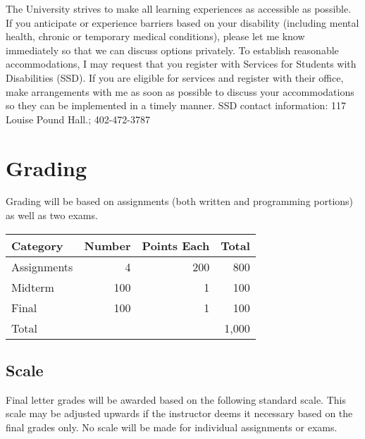 \documentclass[12pt]{scrartcl}
\begin{document}

The University strives to make all learning experiences as 
accessible as possible. If you anticipate or experience 
barriers based on your disability (including mental health, 
chronic or temporary medical conditions), please let me know 
immediately so that we can discuss options privately. To 
establish reasonable accommodations, I may request that you 
register with Services for Students with Disabilities (SSD). 
If you are eligible for services and register with their 
office, make arrangements with me as soon as possible to 
discuss your accommodations so they can be implemented in a 
timely manner. SSD contact information:  117 Louise Pound 
Hall.; 402-472-3787

\section{Grading}

Grading will be based on assignments (both written and programming
portions) as well as two exams.

\begin{table}[h]
\centering
{\small
\setlength{\tabcolsep}{0.5em} %
\renewcommand{\arraystretch}{1.2}%

\begin{tabular}{lrrr}
\hline
\rowcolor{steelblue!50} Category & Number & Points Each & Total \\
\hline
\rowcolor{steelblue!5}  Assignments       &  4  & 200 & 800 \\
\rowcolor{steelblue!10} Midterm           & 100 & 1   & 100 \\
\rowcolor{steelblue!5}  Final             & 100 & 1   & 100 \\
\hline
Total  & & & 1,000 
\end{tabular}
}
\end{table}

\subsection{Scale}

Final letter grades will be awarded based on the following 
standard scale. This scale may be adjusted upwards if the 
instructor deems it necessary based on the final grades only.  
No scale will be made for individual assignments or exams.
\end{document}
